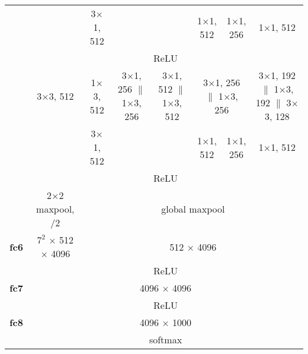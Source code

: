 \documentclass[thesis]{subfiles}
\begin{document}
{\begin{landscape}
{\begin{table*}[p]
\begin{tabular}{@{}|c||c|c|c|c|c|c|c|c|@{}}
    \cline{4-4} \cline{7-9}
    & \multicolumn{2}{c|}{} & 3$\times$1, 512 & & & 1$\times$1, 512 & 1$\times$1, 256 & 1$\times$1, 512\\
    \cline{2-9}
	& \multicolumn{8}{c|}{ReLU}\\
    \cline{2-9}
	& \multicolumn{2}{c|}{3$\times$3, 512} & 1$\times$3, 512 & 3$\times$1, 256 $\|$ 1$\times$3, 256 & 3$\times$1, 512 $\|$ 1$\times$3, 512 & \multicolumn{2}{c|}{3$\times$1, 256 $\|$ 1$\times$3, 256} & 3$\times$1, 192 $\|$ 1$\times$3, 192 $\|$ 3$\times$3, 128\\
	\cline{4-4} \cline{7-9}
    & \multicolumn{2}{c|}{} & 3$\times$1, 512 & & & 1$\times$1, 512 & 1$\times$1, 256 & 1$\times$1, 512\\
    \cline{2-9}
	& \multicolumn{8}{c|}{ReLU}\\
    \cline{2-9}
	& 2$\times$2 maxpool, /2 & \multicolumn{7}{c|}{global maxpool}\\
	\hline
	\textbf{fc6} & $7^2$ $\times$ 512 $\times$ 4096 & \multicolumn{7}{c|}{512 $\times$ 4096}\\
    \cline{2-9}
	& \multicolumn{8}{c|}{ReLU}\\
    \hline
	\textbf{fc7} & \multicolumn{8}{c|}{4096 $\times$ 4096}\\
    \cline{2-9}
	& \multicolumn{8}{c|}{ReLU}\\
    \hline
	\textbf{fc8} & \multicolumn{8}{c|}{4096 $\times$ 1000}\\
    \cline{2-9}
	& \multicolumn{8}{c|}{softmax}\\
    \hline
\end{tabular}
\label{table:vggarch}
\end{table*}
}
\end{landscape}
}
\end{document}
